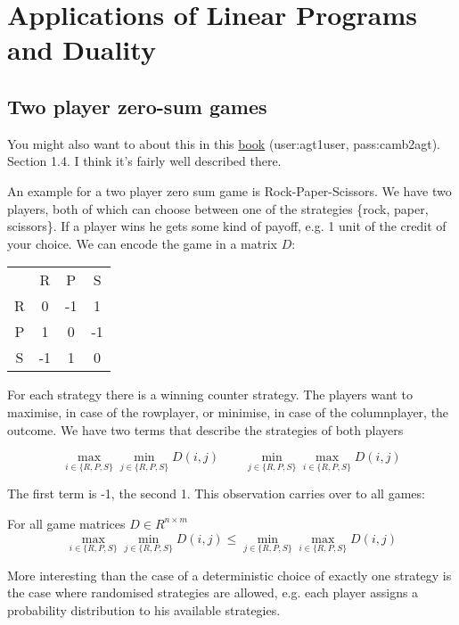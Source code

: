 \section{Applications of Linear Programs and Duality}
\subsection{Two player zero-sum games}

You might also want to about this in this \href{http://www.cambridge.org/journals/nisan/}{book} (user:agt1user, pass:camb2agt). Section 1.4. I think it's fairly well described there.

An example for a two player zero sum game is Rock-Paper-Scissors. We have two players, both of which can choose between one of the strategies \{rock, paper, scissors\}. If a player wins he gets some kind of payoff, e.g. 1 unit of the credit of your choice. We can encode the game in a matrix $D$:

\begin{center}
\begin{tabular}{cccc}
 & R & P & S\\
R & 0 & -1 & 1\\
P & 1 & 0 & -1\\
S & -1 & 1 & 0\\
\end{tabular}
\end{center}

For each strategy there is a winning counter strategy. The players want to maximise, in case of the rowplayer, or minimise, in case of the columnplayer, the outcome. We have two terms that describe the strategies of both players

\[\max_{i\in \{R,P,S\}} \min_{j\in \{R,P,S\}} D(i,j) \qquad \min_{j\in \{R,P,S\}}\max_{i\in \{R,P,S\}} D(i,j)\]

The first term is -1, the second 1. This observation carries over to all games:

\begin{lem}\label{2pzsLemma1} For all game matrices $D\in R^{n\times m}$
\[\max_{i\in \{R,P,S\}} \min_{j\in \{R,P,S\}} D(i,j) \leq \min_{j\in \{R,P,S\}}\max_{i\in \{R,P,S\}} D(i,j)\]
\end{lem}

More interesting than the case of a deterministic choice of exactly one strategy is the case where randomised strategies are allowed, e.g. each player assigns a probability distribution to his available strategies.

